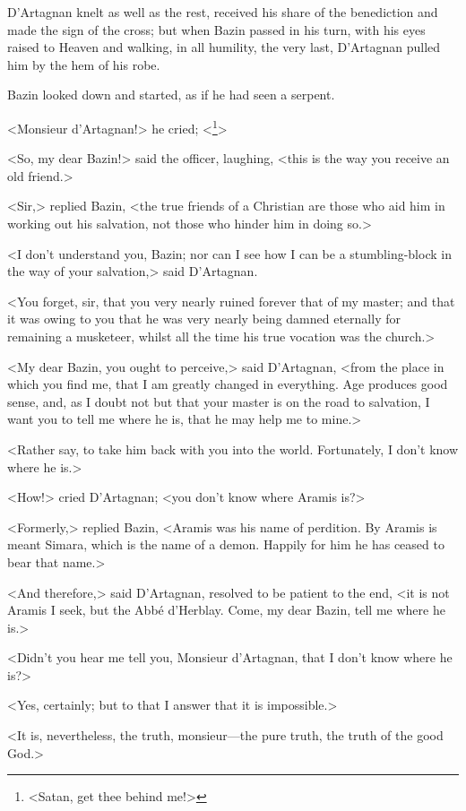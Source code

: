 D'Artagnan knelt as well as the rest, received his share of the benediction and made the sign of the cross; but when Bazin passed in his turn, with his eyes raised to Heaven and walking, in all humility, the very last, D'Artagnan pulled him by the hem of his robe.

Bazin looked down and started, as if he had seen a serpent.

<Monsieur d'Artagnan!> he cried; <\footnote{<Satan, get thee behind me!>}>

<So, my dear Bazin!> said the officer, laughing, <this is the way you receive an old friend.>

<Sir,> replied Bazin, <the true friends of a Christian are those who aid him in working out his salvation, not those who hinder him in doing so.>

<I don't understand you, Bazin; nor can I see how I can be a stumbling-block in the way of your salvation,> said D'Artagnan.

<You forget, sir, that you very nearly ruined forever that of my master; and that it was owing to you that he was very nearly being damned eternally for remaining a musketeer, whilst all the time his true vocation was the church.>

<My dear Bazin, you ought to perceive,> said D'Artagnan, <from the place in which you find me, that I am greatly changed in everything. Age produces good sense, and, as I doubt not but that your master is on the road to salvation, I want you to tell me where he is, that he may help me to mine.>

<Rather say, to take him back with you into the world. Fortunately, I don't know where he is.>

<How!> cried D'Artagnan; <you don't know where Aramis is?>

<Formerly,> replied Bazin, <Aramis was his name of perdition. By Aramis is meant Simara, which is the name of a demon. Happily for him he has ceased to bear that name.>

<And therefore,> said D'Artagnan, resolved to be patient to the end, <it is not Aramis I seek, but the Abbé d'Herblay. Come, my dear Bazin, tell me where he is.>

<Didn't you hear me tell you, Monsieur d'Artagnan, that I don't know where he is?>

<Yes, certainly; but to that I answer that it is impossible.>

<It is, nevertheless, the truth, monsieur—the pure truth, the truth of the good God.>

